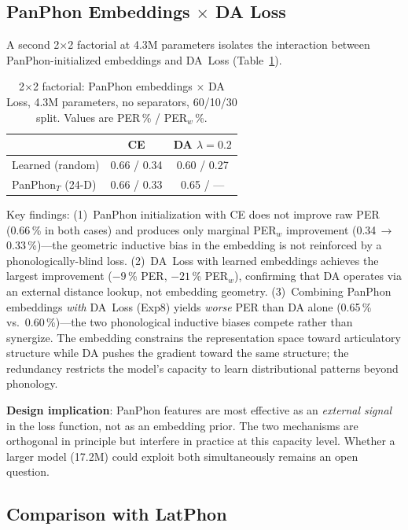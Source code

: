 \documentclass[conference]{IEEEtran}
\newcommand{\lam}{\lambda}                %
\begin{document}
\subsection{PanPhon Embeddings $\times$ DA Loss}
\label{sec:panphon_factorial}

A second 2$\times$2 factorial at 4.3M parameters isolates the
interaction between PanPhon-initialized embeddings and DA~Loss
(Table~\ref{tab:panphon_factorial}).

\begin{table}[t]
  \caption{2$\times$2 factorial: PanPhon embeddings $\times$ DA Loss,
           4.3M parameters, no separators, 60/10/30 split.
           Values are PER\,\% / PER$_w$\,\%.}
  \label{tab:panphon_factorial}
  \centering\small
  \begin{tabular}{lcc}
    \toprule
    & CE & DA $\lam\!=\!0.2$ \\
    \midrule
    Learned (random)     & 0.66 / 0.34 & 0.60 / 0.27 \\
    PanPhon$_T$ (24-D)   & 0.66 / 0.33 & 0.65 / --- \\
    \bottomrule
  \end{tabular}
\end{table}

Key findings:
(1)~PanPhon initialization with CE does not improve raw PER
(0.66\,\% in both cases) and produces only marginal PER$_w$
improvement (0.34\,$\to$\,0.33\,\%)---the geometric inductive bias
in the embedding is not reinforced by a phonologically-blind loss.
(2)~DA~Loss with learned embeddings achieves the largest improvement
($-9$\,\% PER, $-21$\,\% PER$_w$), confirming that DA operates via
an external distance lookup, not embedding geometry.
(3)~Combining PanPhon embeddings \emph{with} DA~Loss (Exp8) yields
\emph{worse} PER than DA alone (0.65\,\% vs.\ 0.60\,\%)---the two
phonological inductive biases compete rather than synergize.
The embedding constrains the representation space toward articulatory
structure while DA pushes the gradient toward the same structure;
the redundancy restricts the model's capacity to learn
distributional patterns beyond phonology.

\textbf{Design implication}: PanPhon features are most effective as
an \emph{external signal} in the loss function, not as an embedding
prior.
The two mechanisms are orthogonal in principle but interfere in
practice at this capacity level.
Whether a larger model (17.2M) could exploit both simultaneously
remains an open question.

\subsection{Comparison with LatPhon}
\end{document}
